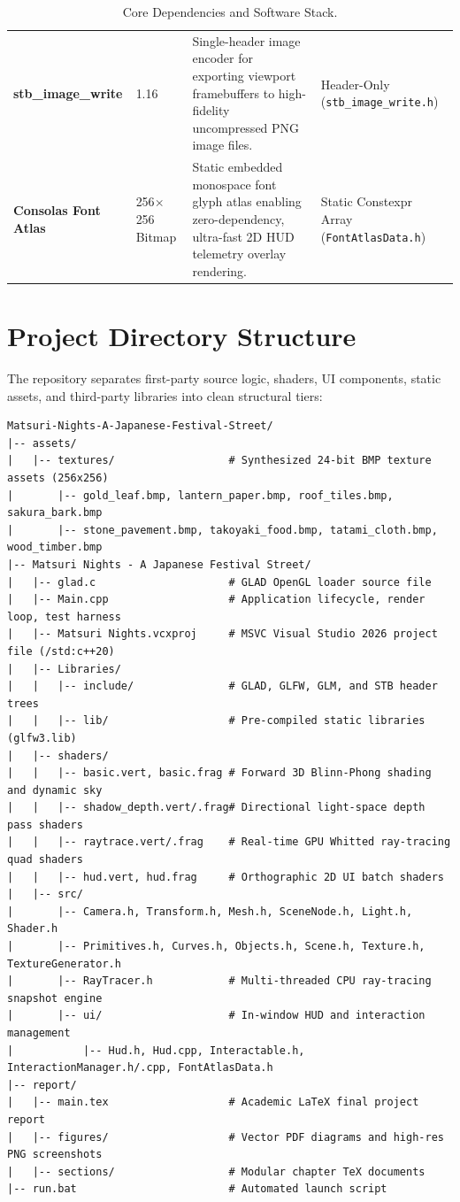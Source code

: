\begin{table}[htbp]
\begin{tabularx}{\textwidth}{p{3.2cm} p{2.2cm} p{5.5cm} p{3.5cm}}
\addlinespace
\textbf{stb\_image\_write} & 1.16 & Single-header image encoder for exporting viewport framebuffers to high-fidelity uncompressed PNG image files. & Header-Only (\texttt{stb\_image\_write.h}) \\
\addlinespace
\textbf{Consolas Font Atlas} & 256$\times$256 Bitmap & Static embedded monospace font glyph atlas enabling zero-dependency, ultra-fast 2D HUD telemetry overlay rendering. & Static Constexpr Array (\texttt{FontAtlasData.h}) \\
\bottomrule
\end{tabularx}
\caption{Core Dependencies and Software Stack.}
\label{tab:dependencies}
\end{table}

\section{Project Directory Structure}
The repository separates first-party source logic, shaders, UI components, static assets, and third-party libraries into clean structural tiers:

\begin{lstlisting}[basicstyle=\ttfamily\tiny, frame=single, backgroundcolor=\color{gray!10}, aboveskip=2pt, belowskip=2pt]
Matsuri-Nights-A-Japanese-Festival-Street/
|-- assets/
|   |-- textures/                  # Synthesized 24-bit BMP texture assets (256x256)
|       |-- gold_leaf.bmp, lantern_paper.bmp, roof_tiles.bmp, sakura_bark.bmp
|       |-- stone_pavement.bmp, takoyaki_food.bmp, tatami_cloth.bmp, wood_timber.bmp
|-- Matsuri Nights - A Japanese Festival Street/
|   |-- glad.c                     # GLAD OpenGL loader source file
|   |-- Main.cpp                   # Application lifecycle, render loop, test harness
|   |-- Matsuri Nights.vcxproj     # MSVC Visual Studio 2026 project file (/std:c++20)
|   |-- Libraries/
|   |   |-- include/               # GLAD, GLFW, GLM, and STB header trees
|   |   |-- lib/                   # Pre-compiled static libraries (glfw3.lib)
|   |-- shaders/
|   |   |-- basic.vert, basic.frag # Forward 3D Blinn-Phong shading and dynamic sky
|   |   |-- shadow_depth.vert/.frag# Directional light-space depth pass shaders
|   |   |-- raytrace.vert/.frag    # Real-time GPU Whitted ray-tracing quad shaders
|   |   |-- hud.vert, hud.frag     # Orthographic 2D UI batch shaders
|   |-- src/
|       |-- Camera.h, Transform.h, Mesh.h, SceneNode.h, Light.h, Shader.h
|       |-- Primitives.h, Curves.h, Objects.h, Scene.h, Texture.h, TextureGenerator.h
|       |-- RayTracer.h            # Multi-threaded CPU ray-tracing snapshot engine
|       |-- ui/                    # In-window HUD and interaction management
|           |-- Hud.h, Hud.cpp, Interactable.h, InteractionManager.h/.cpp, FontAtlasData.h
|-- report/
|   |-- main.tex                   # Academic LaTeX final project report
|   |-- figures/                   # Vector PDF diagrams and high-res PNG screenshots
|   |-- sections/                  # Modular chapter TeX documents
|-- run.bat                        # Automated launch script
\end{lstlisting}

